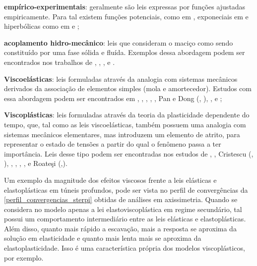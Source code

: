 \begin{alineas}
	
	\item \textbf{empírico-experimentais}: geralmente são leis expressas por funções ajustadas empiricamente. Para tal existem funções potenciais, como em , exponeciais em  e hiperbólicas como em  e ;
	
	\item \textbf{acoplamento hidro-mecânico}: leis que consideram o maciço como sendo constituído por uma fase sólida e fluída. Exemplos dessa abordagem podem ser encontrados nos trabalhos de , , ,  e .
	
	\item \textbf{Viscoelásticas}: leis formuladas através da analogia com sistemas mecânicos derivados da associação de elementos simples (mola e amortecedor). Estudos com essa abordagem podem ser encontrados em , , , , , Pan e Dong (\citeyear{Pan1991a}, \citeyear{Pan1991b}), ,  e ;
	
	\item \textbf{Viscoplásticas}: leis formuladas através da teoria da plasticidade dependente do tempo, que, tal como as leis viscoelásticas, também possuem uma analogia com sistemas mecânicos elementares, mas introduzem um elemento de atrito, para representar o estado de tensões a partir do qual o fenômeno passa a ter importância. Leis desse tipo podem ser encontradas nos estudos de , , Cristescu (\citeyear{Cristescu1985}, \citeyear{Cristescu1988}), , , , ,  e Roate\c{s}i (\citeyear{Roatesi2012},\citeyear{Roatesi2014}).
	
\end{alineas}

Um exemplo da magnitude dos efeitos viscosos frente a leis elásticas e elastoplásticas em túneis profundos, pode ser vista no perfil de convergências da \autoref{perfil_convergencias_sterpi} obtidas de análises em axissimetria. Quando se considera no modelo apenas a lei elastoviscoplástica em regime secundário, tal possui um comportamento intermediário entre as leis elásticas e elastoplásticas. Além disso, quanto mais rápido a escavação, mais a resposta se aproxima da solução em elasticidade e quanto mais lenta mais se aproxima da elastoplasticidade. Isso é uma característica própria dos modelos viscoplásticos, por exemplo.

